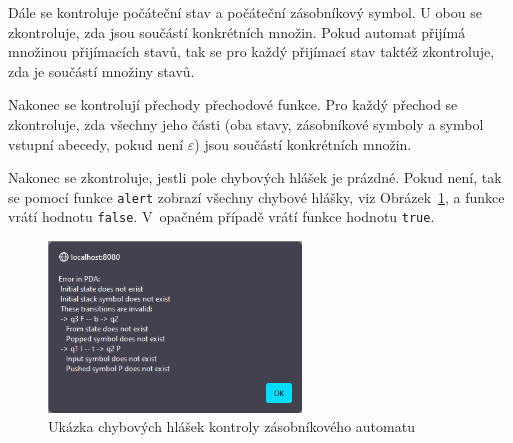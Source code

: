 Dále se kontroluje počáteční stav a počáteční zásobníkový symbol. U obou se zkontroluje, zda jsou součástí konkrétních množin. Pokud automat přijímá množinou přijímacích stavů, tak se pro každý přijímací stav taktéž zkontroluje, zda je součástí množiny stavů. 

Nakonec se kontrolují přechody přechodové funkce. Pro každý přechod se zkontroluje, zda všechny jeho části (oba stavy, zásobníkové symboly a symbol vstupní abecedy, pokud není $\varepsilon$) jsou součástí konkrétních množin.

Nakonec se zkontroluje, jestli pole chybových hlášek je prázdné. Pokud není, tak se pomocí funkce \texttt{alert} zobrazí všechny chybové hlášky, viz Obrázek~\ref{fig:PDACheckErrors}, a funkce vrátí hodnotu \texttt{false}. V~opačném případě vrátí funkce hodnotu \texttt{true}.

\begin{figure}[h]
    \centering
    \includegraphics[width=0.6\textwidth]{Figures/PrntScrn_PDACheckErrors.png}
    \caption{Ukázka chybových hlášek kontroly zásobníkového automatu}\label{fig:PDACheckErrors}
\end{figure}

\endinput